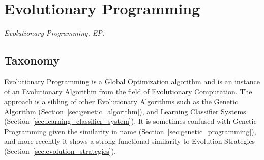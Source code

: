 

\section{Evolutionary Programming} 
\label{sec:evolutionary_programming}

\emph{Evolutionary Programming, EP.}

\subsection{Taxonomy}
Evolutionary Programming is a Global Optimization algorithm and is an instance of an Evolutionary Algorithm from the field of Evolutionary Computation.
The approach is a sibling of other Evolutionary Algorithms such as the Genetic Algorithm (Section~\ref{sec:genetic_algorithm}), and Learning Classifier Systems (Section~\ref{sec:learning_classifier_system}). It is sometimes confused with Genetic Programming given the similarity in name (Section~\ref{sec:genetic_programming}), and more recently it shows a strong functional similarity to Evolution Strategies (Section~\ref{sec:evolution_strategies}). 

